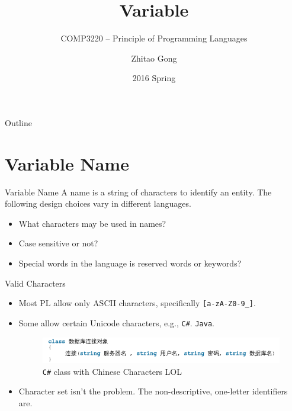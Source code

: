 \documentclass[presentation]{beamer}
\author{Zhitao Gong}
\date{2016 Spring}
\title{Variable}
\subtitle{COMP3220 -- Principle of Programming Languages}
\begin{document}
\maketitle
\begin{frame}{Outline}
\setcounter{tocdepth}{2}
\tableofcontents
\end{frame}


\section{Variable Name}
\label{sec:orgheadline7}

\begin{frame}[label={sec:orgheadline1}]{Variable Name}
A name is a string of characters to identify an entity.  The
following design choices vary in different languages.

\begin{itemize}
\item What characters may be used in names?
\item Case sensitive or not?
\item Special words in the language is reserved words or keywords?
\end{itemize}
\end{frame}

\begin{frame}[fragile,label={sec:orgheadline2}]{Valid Characters}
 \begin{itemize}
\item Most PL allow only ASCII characters, specifically \texttt{[a-zA-Z0-9\_]}.
\item Some allow certain Unicode characters, e.g., \texttt{C\#}. \texttt{Java}.

\begin{figure}[htb]
\centering
\includegraphics[width=.9\linewidth]{img/csharp-unicode.png}
\caption{\texttt{C\#} class with Chinese Characters LOL}
\end{figure}

\item Character set isn’t the problem.  The non-descriptive, one-letter
identifiers are.
\end{itemize}
\end{frame}
\end{document}
